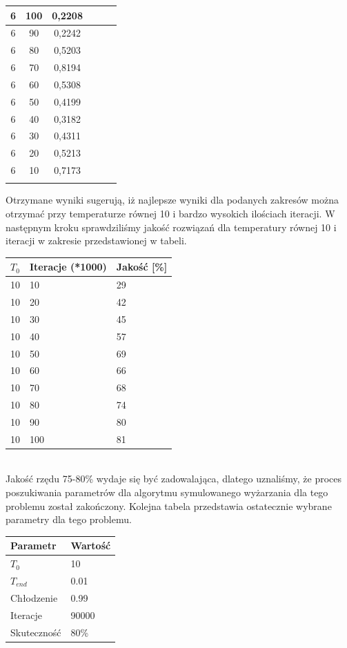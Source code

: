 \documentclass[twoside]{projektInzynierskiMS1}
\newcommand{\si}{ś}
\begin{document}
\begin{table}[htbp]
\begin{tabular}{|c|c|c||c|c|c|}
6 & 100 & 0,2208 \\ \hline 
6 & 90 & 0,2242 \\ \hline 
6 & 80 & 0,5203 \\ \hline 
6 & 70 & 0,8194 \\ \hline 
6 & 60 & 0,5308 \\ \hline 
6 & 50 & 0,4199\\ \hline 
6 & 40 & 0,3182 \\ \hline 
6 & 30 & 0,4311 \\ \hline 
6 & 20 & 0,5213 \\ \hline 
6 & 10 & 0,7173 \\ \Xhline{3\arrayrulewidth}


\end{tabular} 
\end{table}

Otrzymane wyniki sugerują, iż najlepsze wyniki dla podanych zakresów można otrzymać przy temperaturze równej 10 i bardzo wysokich ilo\si ciach iteracji. W następnym kroku sprawdzili\si my jako\si ć rozwiązań dla temperatury równej 10 i iteracji w zakresie przedstawionej w tabeli. \\

\begin{tabularx}{\textwidth}{|X|X|X|} 
                  \hline
 \textbf{ $T_0$} & \textbf{Iteracje (*1000)}& \textbf{ Jako\si ć [\%]}\\ \hline
10 & 10 & 29 \\ \hline
10 & 20 & 42 \\ \hline
10 & 30 & 45 \\ \hline 
10 & 40 & 57 \\ \hline 
10 & 50 & 69 \\ \hline 
10 & 60 & 66 \\ \hline
10 & 70 & 68 \\ \hline 
10 & 80 & 74 \\ \hline 
10 & 90 &  80\\ \hline 
10 & 100 & 81 \\ \hline 
\end{tabularx} \\

Jako\si ć rzędu 75-80\% wydaje się być zadowalająca, dlatego uznali\si my, że proces poszukiwania parametrów dla algorytmu symulowanego wyżarzania dla tego problemu został zakończony. Kolejna tabela przedstawia ostatecznie wybrane parametry dla tego problemu. \\

\begin{tabularx}{\textwidth}{ |X|X|} 
\hline
 \textbf{ Parametr} & \textbf{ Warto\si ć}\\ \hline
 $T_0$ & 10 \\ \hline 
 $T_{end}$ & 0.01 \\ \hline 
 Chłodzenie& 0.99 \\ \hline 
 Iteracje & 90000 \\ \hline 
 Skuteczno\si ć & 80\% \\ \hline 
\end{tabularx}
\end{document}
